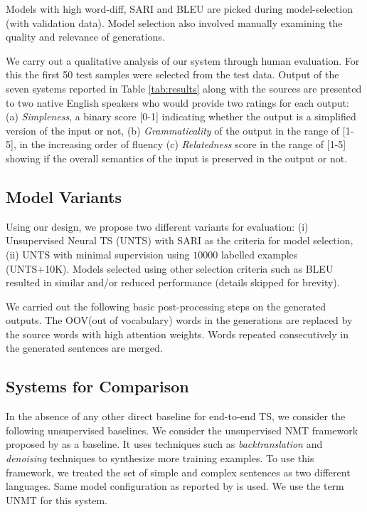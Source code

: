 \documentclass[11pt,a4paper]{article}
\begin{document}
Models with high word-diff, SARI and BLEU are picked during model-selection (with validation data). Model selection also involved manually examining the quality and relevance of generations.

We carry out a qualitative analysis of our system through human evaluation. For this the first 50 test samples were selected from the test data. Output of the seven systems reported in Table \ref{tab:results} along with the sources are presented to two native English speakers who would provide two ratings for each output: (a) \textit{Simpleness}, a binary score [0-1] indicating whether the output is a simplified version of the input or not, (b) \textit{Grammaticality} of the output in the range of [1-5], in the increasing order of fluency (c) \textit{Relatedness} score in the range of [1-5] showing if the overall semantics of the input is preserved in the output or not.

\subsection{Model Variants}
Using our design, we propose two different variants for evaluation: (i) Unsupervised Neural TS (\textsc{UNTS}) with SARI as the criteria for model selection, (ii) \textsc{UNTS} with minimal supervision using $10000$ labelled examples (UNTS+10K). Models selected using other selection criteria such as BLEU resulted in similar and/or reduced performance (details skipped for brevity).

We carried out the following basic post-processing steps on the generated outputs. The OOV(out of vocabulary) words in the generations are replaced by the source words with high attention weights. Words repeated consecutively  in the generated sentences are merged.

\subsection{Systems for Comparison}
\label{exp:exp}
In the absence of any other direct baseline for end-to-end TS, we consider the following unsupervised baselines. We consider the unsupervised NMT framework proposed by \cite{artetxe2018iclr} as a baseline. It uses techniques such as \textit{backtranslation} and \textit{denoising} techniques to synthesize more training examples. To use this framework, we treated the set of simple and complex sentences as two different languages. Same model configuration as reported by   is used. We use the term \textsc{UNMT} for this system. 
\end{document}
